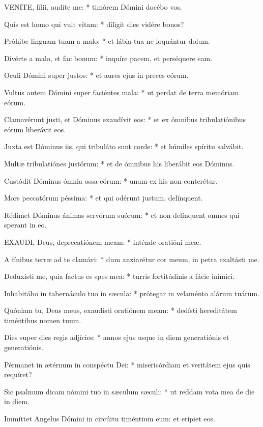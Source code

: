 
\lettrine[lines=2]{V}{ENITE}, fílii, audíte me: * timórem Dómini docébo vos.

Quis est homo qui vult vitam: * díligit dies vidére bonos?

Próhibe linguam tuam a malo: * et lábia tua ne loquántur dolum.

Divérte a malo, et fac bonum: * inquíre pacem, et perséquere eam.

Oculi Dómini super justos: * et aures ejus in preces eórum.

Vultus autem Dómini super faciéntes mala: * ut perdat de terra memóriam eórum.

Clamavérunt justi, et Dóminus exaudívit eos: * et ex ómnibus tribulatiónibus eórum liberávit eos.

Juxta est Dóminus iis, qui tribuláto sunt corde: * et húmiles spíritu salvábit.

Multæ tribulatiónes justórum: * et de ómnibus his liberábit eos Dóminus.

Custódit Dóminus ómnia ossa eórum: * unum ex his non conterétur.

Mors peccatórum péssima: * et qui odérunt justum, delínquent.

Rédimet Dóminus ánimas servórum suórum: * et non delínquent omnes qui sperant in eo.


\lettrine[lines=2]{E}{XAUDI}, Deus, deprecatiónem meam: * inténde oratióni meæ.

A fínibus terræ ad te clamávi: * dum anxiarétur cor meum, in petra exaltásti me.

Deduxísti me, quia factus es spes mea: * turris fortitúdinis a fácie inimíci.

Inhabitábo in tabernáculo tuo in sæcula: * prótegar in velaménto alárum tuárum.

Quóniam tu, Deus meus, exaudísti oratiónem meam: * dedísti hereditátem timéntibus nomen tuum.

Dies super dies regis adjícies: * annos ejus usque in diem generatiónis et generatiónis.

Pérmanet in ætérnum in conspéctu Dei: * misericórdiam et veritátem ejus quis requíret?

Sic psalmum dicam nómini tuo in sæculum sæculi: * ut reddam vota mea de die in diem.

 Immíttet Angelus Dómini in circúitu timéntium eum: et erípiet eos.

